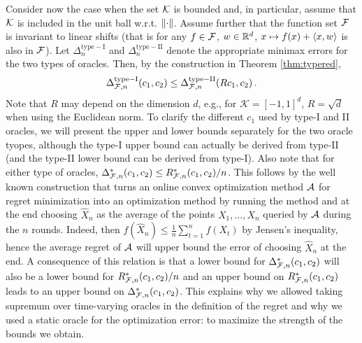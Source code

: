 Consider now the case when the set $\mathcal{K}$ is bounded and, in particular, assume that 
$\mathcal{K}$ is included in the unit ball w.r.t. $\left\|\cdot\right\|$.
Assume further that the function set $\mathcal{F}$ is invariant to linear shifts
(that is for any $f\in \mathcal{F}$, $w\in \mathbb{R}^d$, $x\mapsto f(x) + \langle x,w \rangle$ is also in $\mathcal{F}$).
Let
 $\Delta_{n}^{\mathrm{type-I}}$ and $\Delta_{n}^{\mathrm{type-II}}$ denote  the appropriate minimax errors for the two types of oracles.
Then, by the construction in  Theorem \ref{thm:typered},
\begin{align}
\Delta_{\mathcal{F},n}^{\mathrm{type-I}}(c_1,c_2) \le \Delta_{\mathcal{F},n}^{\mathrm{type-II}}(Rc_1,c_2)\,.
\end{align}
Note that $R$ may depend on the dimension $d$, e.g., for $\mathcal{K} = \left[ -1,1 \right]^d$, $R = \sqrt{d}$ when using the Euclidean norm. To clarify the different $c_1$ used by type-I and II oracles, we will present the upper and lower bounds separately for the two oracle tyopes, although the type-I upper bound can actually be derived from type-II (and the type-II lower bound can be derived from type-I). 
Also note that for either type of oracles, $\Delta_{\mathcal{F},n}^*(c_1,c_2) \le R_{\mathcal{F},n}^*(c_1,c_2)/n$. This follows by the well known construction that turns an online convex optimization method $\mathcal{A}$ for regret minimization into an optimization method by running the method and at the end choosing $\hat{X}_n$ as the average of the points $X_1,\dots,X_n$ queried by $\mathcal{A}$ during the $n$ rounds.
Indeed, then $f(\hat{X}_n) \le \frac1n \sum_{t=1}^n f(X_t)$ by Jensen's inequality, hence the average regret of $\mathcal{A}$ will upper bound the error of choosing $\hat{X}_n$ at the end.
A consequence of this relation is that a lower bound for $\Delta_{\mathcal{F},n}^*(c_1,c_2) $ will also be a lower bound for $R^*_{\mathcal{F},n}(c_1,c_2)/n$ and an upper bound on $R^*_{\mathcal{F},n}(c_1,c_2)$ leads to an upper bound on $\Delta_{\mathcal{F},n}^*(c_1,c_2)$. This explains why we allowed taking supremum over time-varying oracles in the definition of the regret and why we used a static oracle for the optimization error: to maximize the strength of the bounds we obtain.

